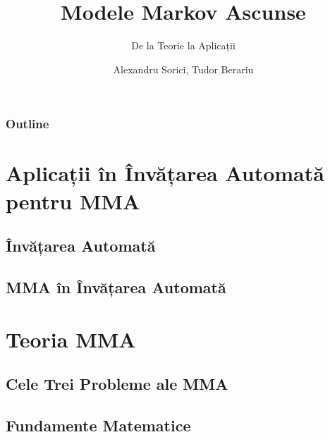 \documentclass{beamer}
\title[ARIA]{Modele Markov Ascunse}
\subtitle{De la Teorie la Aplicații}
\author[A. Sorici, T. Berariu]{Alexandru Sorici, Tudor Berariu}
\institute[AI-MAS]{Asociația Română pentru Inteligență Artificială}
\begin{document}
\maketitle



\begin{frame}
  \tableofcontents[onlyparts]
\end{frame}

\begin{frame}
  \frametitle{Outline}
  \tableofcontents[pausesections]
\end{frame}

\section{Aplicații în Învățarea Automată pentru MMA}
\label{sec:intro-to-hmm}

\subsection{Învățarea Automată}
\label{sec:machine-learning}



\subsection{MMA în Învățarea Automată}
\label{sec:hmm-in-ml}



\section{Teoria MMA}
\label{sec:theory}

\subsection{Cele Trei Probleme ale MMA}
\label{sec:three-problmes}



\subsection{Fundamente Matematice}
\label{sec:math-foundations}


\end{document}
